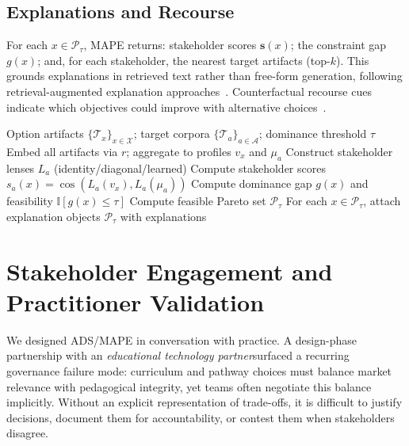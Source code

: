 \documentclass[sigconf,review]{acmart}
\newcommand{\ADS}{\textsc{ADS}\xspace}
\newcommand{\MAPE}{\textsc{MAPE}\xspace}
\newcommand{\IndustryPartner}{\textit{educational technology partner}}
\begin{document}
\subsection{Explanations and Recourse}
For each $x\in\mathcal{P}_\tau$, \MAPE returns: stakeholder scores $\mathbf{s}(x)$; the constraint gap $g(x)$; and, for each stakeholder, the nearest target artifacts (top-$k$). This grounds explanations in retrieved text rather than free-form generation, following retrieval-augmented explanation approaches~\cite{zhang2020explainableRS}. Counterfactual recourse cues indicate which objectives could improve with alternative choices~\cite{wachter2017counterfactual,ustun2019recourse}.

\begin{algorithm}[t]
\caption{\MAPE in \ADS (prototype pipeline)}
\label{alg:mape}
\begin{algorithmic}[1]
\REQUIRE Option artifacts $\{\mathcal{T}_x\}_{x\in\mathcal{X}}$; target corpora $\{\mathcal{T}_a\}_{a\in\mathcal{A}}$; dominance threshold $\tau$
\STATE Embed all artifacts via $r$; aggregate to profiles $v_x$ and $\mu_a$
\STATE Construct stakeholder lenses $L_a$ (identity/diagonal/learned)
  \STATE Compute stakeholder scores $s_a(x)=\cos(L_a(v_x),L_a(\mu_a))$
  \STATE Compute dominance gap $g(x)$ and feasibility $\mathbb{I}[g(x)\le\tau]$
\ENDFOR
\STATE Compute feasible Pareto set $\mathcal{P}_\tau$
\STATE For each $x\in\mathcal{P}_\tau$, attach explanation objects
\RETURN $\mathcal{P}_\tau$ with explanations
\end{algorithmic}
\end{algorithm}


\section{Stakeholder Engagement and Practitioner Validation}
\label{sec:collab}

We designed \ADS/\MAPE in conversation with practice. A design-phase partnership with an \IndustryPartner surfaced a recurring governance failure mode: curriculum and pathway choices must balance market relevance with pedagogical integrity, yet teams often negotiate this balance implicitly. Without an explicit representation of trade-offs, it is difficult to justify decisions, document them for accountability, or contest them when stakeholders disagree.
\end{document}
